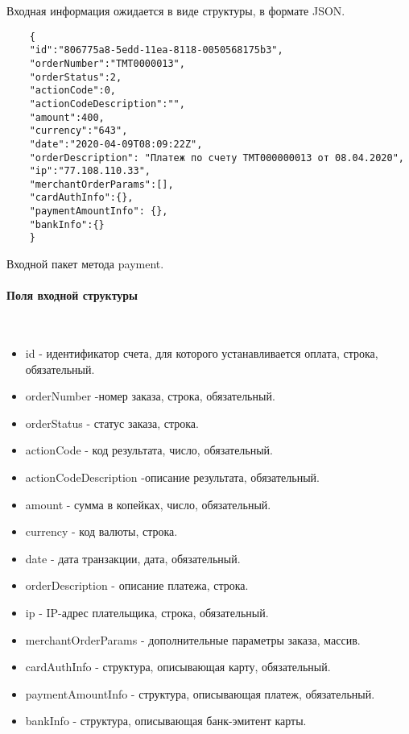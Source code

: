 \documentclass[11pt, a4paper]{article}
\begin{document}
Входная информация ожидается в виде структуры, в формате JSON.

\begin{listing}[H]
	\begin{verbatim}
	{
	"id":"806775a8-5edd-11ea-8118-0050568175b3",
	"orderNumber":"ТМТ0000013",
	"orderStatus":2,
	"actionCode":0,
	"actionCodeDescription":"",
	"amount":400,
	"currency":"643",
	"date":"2020-04-09T08:09:22Z",
	"orderDescription": "Платеж по счету ТМТ000000013 от 08.04.2020",
	"ip":"77.108.110.33",
	"merchantOrderParams":[],
	"cardAuthInfo":{},
	"paymentAmountInfo": {},
	"bankInfo":{}
	}
	\end{verbatim}
	\caption{Входной пакет метода payment.} 
\end{listing}

\paragraph{Поля входной структуры}\

\begin{itemize}
	\item id - идентификатор счета, для которого устанавливается оплата, строка, обязательный.
	\item orderNumber -номер заказа, строка, обязательный.
	\item orderStatus - статус заказа, строка.
	\item actionCode - код результата, число, обязательный.
	\item actionCodeDescription -описание результата, обязательный.
	\item amount - сумма в копейках, число, обязательный.
	\item currency - код валюты, строка.
	\item date - дата транзакции, дата, обязательный.
	\item orderDescription - описание платежа, строка.
	\item ip - IP-адрес плательщика, строка, обязательный.
	\item merchantOrderParams - дополнительные параметры заказа, массив.
	\item cardAuthInfo - структура, описывающая карту, обязательный.
	\item paymentAmountInfo - структура, описывающая платеж, обязательный.
	\item bankInfo - структура, описывающая банк-эмитент карты.
\end{itemize}
\end{document}
